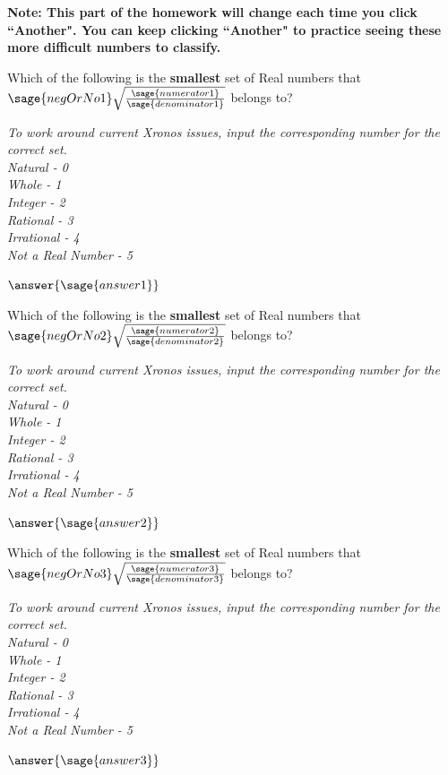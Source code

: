 \documentclass{ximera}
\begin{document}
\textbf{Note: This part of the homework will change each time you click ``Another". You can keep clicking ``Another" to practice seeing these more difficult numbers to classify.}

\begin{question}
Which of the following is the \textbf{smallest} set of Real numbers that $\sage{negOrNo1} \sqrt{ \frac{\sage{numerator1}}{\sage{denominator1}}} $ belongs to? 

\textit{To work around current Xronos issues, input the corresponding number for the correct set. \\
Natural - 0 \\
Whole - 1 \\
Integer - 2 \\
Rational - 3 \\
Irrational - 4 \\
Not a Real Number - 5
}

$\answer{\sage{answer1}}$
\end{question}

\begin{question}
Which of the following is the \textbf{smallest} set of Real numbers that $\sage{negOrNo2} \sqrt{\frac{\sage{numerator2}}{\sage{denominator2}}} $ belongs to? 

\textit{To work around current Xronos issues, input the corresponding number for the correct set. \\
Natural - 0 \\
Whole - 1 \\
Integer - 2 \\
Rational - 3 \\
Irrational - 4 \\
Not a Real Number - 5
}

$\answer{\sage{answer2}}$
\end{question}

\begin{question}
Which of the following is the \textbf{smallest} set of Real numbers that $\sage{negOrNo3} \sqrt{\frac{\sage{numerator3}}{\sage{denominator3}}} $ belongs to? 
	
\textit{To work around current Xronos issues, input the corresponding number for the correct set. \\
Natural - 0 \\
Whole - 1 \\
Integer - 2 \\
Rational - 3 \\
Irrational - 4 \\
Not a Real Number - 5
}
	
$\answer{\sage{answer3}}$
\end{question}
\end{document}
